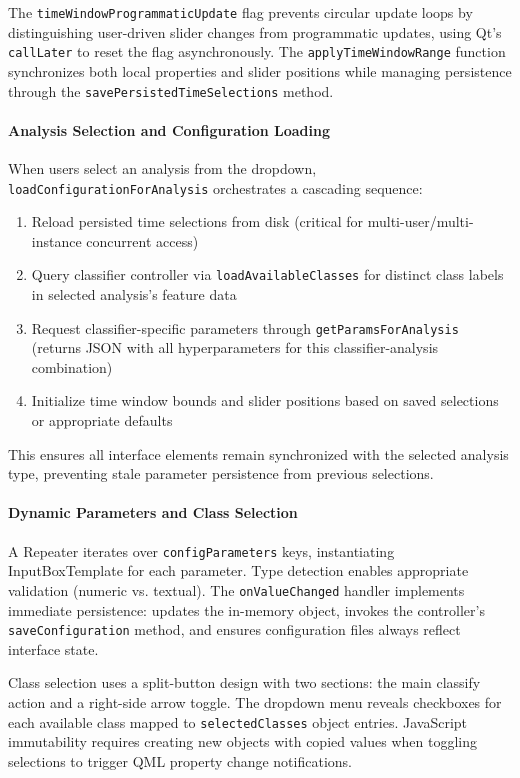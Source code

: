 \documentclass[12pt]{report}
\begin{document}
The \verb|timeWindowProgrammaticUpdate| flag prevents circular update loops by distinguishing user-driven slider changes from programmatic updates, using Qt's \verb|callLater| to reset the flag asynchronously. The \verb|applyTimeWindowRange| function synchronizes both local properties and slider positions while managing persistence through the \verb|savePersistedTimeSelections| method.

\paragraph{Analysis Selection and Configuration Loading}\mbox{}

When users select an analysis from the dropdown, \verb|loadConfigurationForAnalysis| orchestrates a cascading sequence:

\begin{enumerate}
\item Reload persisted time selections from disk (critical for multi-user/multi-instance concurrent access)
\item Query classifier controller via \verb|loadAvailableClasses| for distinct class labels in selected analysis's feature data
\item Request classifier-specific parameters through \verb|getParamsForAnalysis| (returns JSON with all hyperparameters for this classifier-analysis combination)
\item Initialize time window bounds and slider positions based on saved selections or appropriate defaults
\end{enumerate}

This ensures all interface elements remain synchronized with the selected analysis type, preventing stale parameter persistence from previous selections.

\paragraph{Dynamic Parameters and Class Selection}\mbox{}

A Repeater iterates over \verb|configParameters| keys, instantiating InputBoxTemplate for each parameter. Type detection enables appropriate validation (numeric vs. textual). The \verb|onValueChanged| handler implements immediate persistence: updates the in-memory object, invokes the controller's \verb|saveConfiguration| method, and ensures configuration files always reflect interface state.

Class selection uses a split-button design with two sections: the main classify action and a right-side arrow toggle. The dropdown menu reveals checkboxes for each available class mapped to \verb|selectedClasses| object entries. JavaScript immutability requires creating new objects with copied values when toggling selections to trigger QML property change notifications.
\end{document}
